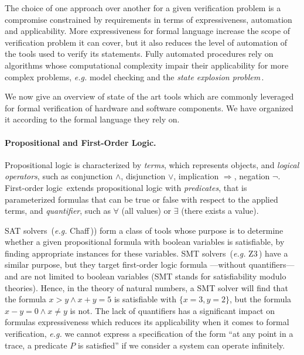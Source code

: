 The choice of one approach over another for a given verification problem is a
compromise constrained by requirements in terms of expressiveness, automation
and applicability.
%
More expressiveness for formal language increase the scope of verification
problem it can cover, but it also reduces the level of automation of the tools
used to verify its statements.
%
Fully automated procedures rely on algorithms whose computational complexity
impair their applicability for more complex problems, \emph{e.g.}  model
checking and the \emph{state explosion problem}\,\cite{clarke2012model}.

We now give an overview of state of the art tools which are commonly leveraged
for formal verification of hardware and software components.
%
We have organized it according to the formal language they rely on.

\paragraph{Propositional and First-Order Logic.}
%
Propositional logic is characterized by \emph{terms}, which represents objects,
and \emph{logical operators}, such as conjunction \( \wedge \), disjunction
\( \vee \), implication \( \Rightarrow \), negation \( \neg \).
%
First-order logic\,\cite{smullyan2012fol} extends propositional logic with
\emph{predicates}, that is parameterized formulas that can be true or false with
respect to the applied terms, and \emph{quantifier}, such as \( \forall \) (all
values) or \( \exists \) (there exists a value).

SAT solvers\,\cite{malik2009boolean} (\emph{e.g.}
Chaff\,\cite{moskewicz2001chaff})) form a class of tools whose purpose is to
determine whether a given propositional formula with boolean variables is
satisfiable, by finding appropriate instances for these variables.
%
SMT solvers\,\cite{barrett20136years} (\emph{e.g.} Z3\,\cite{de2008z3}) have a
similar purpose, but they target first-order logic formula ---without
quantifiers--- and are not limited to boolean variables (SMT stands for
satisfiability modulo theories).
%
Hence, in the theory of natural numbers, a SMT solver will find that the formula
\( x > y \wedge x + y = 5 \) is satisfiable with \( \{ x = 3, y = 2 \} \), but
the formula \( x - y = 0 \wedge x \neq y \) is not.
%
The lack of quantifiers has a significant impact on formulas expressiveness
which reduces its applicability when it comes to formal verification,
\emph{e.g.} we cannot express a specification of the form ``at any point in a
trace, a predicate \( P \) is satisfied'' if we consider a system can operate
infinitely.

